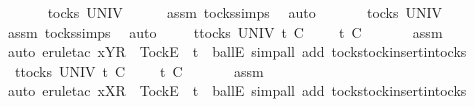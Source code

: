 \begin{isabellebody}
\ \ \isamarkupfalse%
\ {}{\isacharcolon}\ {\isachardoublequoteopen}{\isasymsigma}{\isacharprime}{\isacharprime}\ {\isasymin}\ tocks\ UNIV{\isachardoublequoteclose}\isanewline
\ \ \ \ \isamarkupfalse%
\ assm{}\ tocks{\isachardot}simps\ \isamarkupfalse%
\ auto\isanewline
\ \ \isamarkupfalse%
\ {}{\isacharcolon}\ {\isachardoublequoteopen}{\isasymrho}\ {\isasymin}\ tocks\ UNIV{\isachardoublequoteclose}\isanewline
\ \ \ \ \isamarkupfalse%
\ assm{}\ tocks{\isachardot}simps\ \isamarkupfalse%
\ auto\isanewline
\ \ \isamarkupfalse%
\ {}{\isacharcolon}\ {\isachardoublequoteopen}{\isasymforall}t{\isasymin}tocks\ UNIV{\isachardot}\ t\ {\isasymle}\isactrlsub C\ {\isasymsigma}{\isacharprime}{\isacharprime}\ {\isacharat}\ {\isasymsigma}\ {\isasymlongrightarrow}\ t\ {\isasymle}\isactrlsub C\ {\isasymsigma}{\isacharprime}{\isacharprime}{\isachardoublequoteclose}\isanewline
\ \ \ \ \isamarkupfalse%
\ assm{}\ \isamarkupfalse%
\ {\isacharparenleft}auto{\isacharcomma}\ erule{\isacharunderscore}tac\ x{\isacharequal}{\isachardoublequoteopen}{\isacharbrackleft}Y{\isacharbrackright}\isactrlsub R\ {\isacharhash}\ {\isacharbrackleft}Tock{\isacharbrackright}\isactrlsub E\ {\isacharhash}\ t{\isachardoublequoteclose}\ \ ballE{\isacharcomma}\ simp{\isacharunderscore}all\ add{\isacharcolon}\ tocks{\isachardot}tock{\isacharunderscore}insert{\isacharunderscore}in{\isacharunderscore}tocks{\isacharparenright}\isanewline
\ \ \isamarkupfalse%
\ {}{\isacharcolon}\ {\isachardoublequoteopen}{\isasymforall}t{\isasymin}tocks\ UNIV{\isachardot}\ t\ {\isasymle}\isactrlsub C\ {\isasymrho}\ {\isacharat}\ {\isasymsigma}{\isacharprime}\ {\isasymlongrightarrow}\ t\ {\isasymle}\isactrlsub C\ {\isasymrho}{\isachardoublequoteclose}\isanewline
\ \ \ \ \isamarkupfalse%
\ assm{}\ \isamarkupfalse%
\ {\isacharparenleft}auto{\isacharcomma}\ erule{\isacharunderscore}tac\ x{\isacharequal}{\isachardoublequoteopen}{\isacharbrackleft}X{\isacharbrackright}\isactrlsub R\ {\isacharhash}\ {\isacharbrackleft}Tock{\isacharbrackright}\isactrlsub E\ {\isacharhash}\ t{\isachardoublequoteclose}\ \ ballE{\isacharcomma}\ simp{\isacharunderscore}all\ add{\isacharcolon}\ tocks{\isachardot}tock{\isacharunderscore}insert{\isacharunderscore}in{\isacharunderscore}tocks{\isacharparenright}\isanewline
\ \ \isamarkupfalse%

\end{isabellebody}
